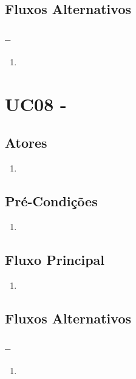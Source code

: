 \subsection{Fluxos Alternativos}

\subsubsection{--}

\begin{enumerate}
  \item
\end{enumerate}

\section{UC08 -}


\subsection{Atores}

\begin{enumerate}
  \item
\end{enumerate}

\subsection{Pré-Condições}
\begin{enumerate}
  \item
\end{enumerate}

\subsection{Fluxo Principal}
\begin{enumerate}
  \item
\end{enumerate}

\subsection{Fluxos Alternativos}

\subsubsection{--}

\begin{enumerate}
  \item
\end{enumerate}

